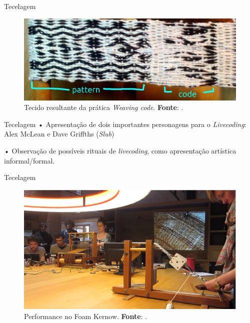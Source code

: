 \documentclass[aspectratio=169]{beamer}
\begin{document}
\begin{frame}{Tecelagem}
\begin{figure}[!h]
    \centering
    \includegraphics[scale=0.31]{imagens/weaving.jpg}
    \caption{Tecido resultante da prática \emph{Weaving code}. \textbf{Fonte}: .}
  \label{fig:weaving}
\end{figure}
\end{frame}

\begin{frame}{Tecelagem}
• Apresentação de dois importantes personagens para o \emph{Livecoding}: Alex McLean e Dave Griffths (\emph{Slub})

• Observação de possíveis rituais de \emph{livecoding}, como apresentação artística informal/formal.
\end{frame}

\begin{frame}{Tecelagem}
\begin{figure}[h]
  \centering
  \includegraphics[scale=0.5]{imagens/weaving.png}
  \caption{Performance no Foam Kernow. \textbf{Fonte}: .}
  \label{fig:weavecoding}
\end{figure}
\end{frame}
\end{document}
